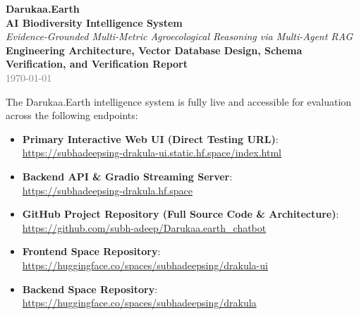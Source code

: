 \documentclass[11pt,a4paper]{article}
\begin{document}
\begin{center}
    {\Huge \bfseries \textcolor{darkbg}{Darukaa.Earth}}\\[6pt]
    {\LARGE \bfseries \textcolor{primary}{AI Biodiversity Intelligence System}}\\[8pt]
    {\large \textit{Evidence-Grounded Multi-Metric Agroecological Reasoning via Multi-Agent RAG}}\\[14pt]
    \textbf{Engineering Architecture, Vector Database Design, Schema Verification, and Verification Report}\\[4pt]
    \textcolor{gray}{\today}
\end{center}

\vspace{0.3em}

\begin{tcolorbox}[colback=boxbg,colframe=primary,title={\textbf{LIVE DEPLOYMENT \& TESTING ACCESS}},fonttitle=\bfseries]
The Darukaa.Earth intelligence system is fully live and accessible for evaluation across the following endpoints:
\begin{itemize}[leftmargin=1.5em, itemsep=3pt]
    \item \textbf{Primary Interactive Web UI (Direct Testing URL)}:\\
    \url{https://subhadeepsing-drakula-ui.static.hf.space/index.html}
    \item \textbf{Backend API \& Gradio Streaming Server}:\\
    \url{https://subhadeepsing-drakula.hf.space}
    \item \textbf{GitHub Project Repository (Full Source Code \& Architecture)}:\\
    \url{https://github.com/subh-adeep/Darukaa.earth_chatbot}
    \item \textbf{Frontend Space Repository}:\\
    \url{https://huggingface.co/spaces/subhadeepsing/drakula-ui}
    \item \textbf{Backend Space Repository}:\\
    \url{https://huggingface.co/spaces/subhadeepsing/drakula}
\end{itemize}
\end{tcolorbox}

\vspace{0.3em}
\end{document}
